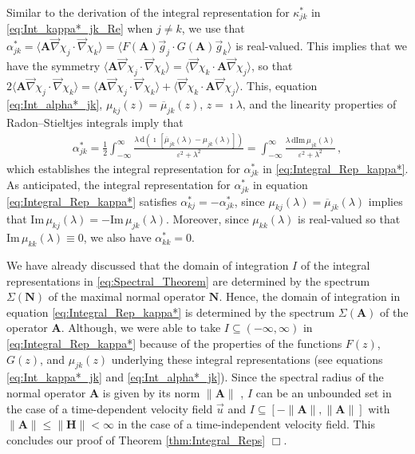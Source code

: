\documentclass[11pt]{amsart}
\renewcommand{\d}{\mathrm{d}}
\newcommand{\Hb}{\mathbf{H}}
\newcommand{\Ab}{\mathbf{A}}
\newcommand{\Nb}{\mathbf{N}}
\begin{document}
Similar to the derivation of the integral representation for
$\kappa^*_{jk}$ in \eqref{eq:Int_kappa*_jk_Re} when $j\neq k$, we use that
$\alpha^*_{jk}=\langle\Ab\vec{\nabla}\chi_j\cdot\vec{\nabla}\chi_k\rangle=\langle F(\Ab)\vec{g}_j\cdot G(\Ab)\vec{g}_k\rangle$
is real-valued. This implies that we have the symmetry
$\langle\Ab\vec{\nabla}\chi_j\cdot\vec{\nabla}\chi_k\rangle=\langle\vec{\nabla}\chi_k\cdot\Ab\vec{\nabla}\chi_j\rangle$, so that
$2\langle\Ab\vec{\nabla}\chi_j\cdot\vec{\nabla}\chi_k\rangle=\langle\Ab\vec{\nabla}\chi_j\cdot\vec{\nabla}\chi_k\rangle+\langle\vec{\nabla}\chi_k\cdot\Ab\vec{\nabla}\chi_j\rangle$.
This, equation \eqref{eq:Int_alpha*_jk},
$\mu_{kj}(z)=\overline{\mu}_{jk}(z)$, $z=\imath\lambda$, and the
linearity properties of Radon--Stieltjes integrals \cite{Stone:64}
imply that 
% 
\begin{align}\label{eq:Int_kappa*_jk_Im}
  \alpha^*_{jk}
       =\frac{1}{2}\int_{-\infty}^\infty\frac{\lambda\,\d(\imath\,[\overline{\mu}_{jk}(\lambda)-\mu_{jk}(\lambda)])}{\varepsilon^2+\lambda^2}
       =\int_{-\infty}^\infty\frac{\lambda\,\d\text{Im}\,\mu_{jk}(\lambda)}{\varepsilon^2+\lambda^2}\,,            
\end{align}
%
which establishes the integral representation for $\alpha^*_{jk}$ in
\eqref{eq:Integral_Rep_kappa*}. As anticipated, the integral
representation for $\alpha^*_{jk}$ in equation
\eqref{eq:Integral_Rep_kappa*} satisfies $\alpha^*_{kj}=-\alpha^*_{jk}$, since
$\mu_{kj}(\lambda)=\overline{\mu}_{jk}(\lambda)$ implies that
$\text{Im}\,\mu_{kj}(\lambda)=-\text{Im}\,\mu_{jk}(\lambda)$. Moreover, since
$\mu_{kk}(\lambda)$ is real-valued so that $\text{Im}\,\mu_{kk}(\lambda)\equiv0$, we also
have $\alpha^*_{kk}=0$.   



We have already discussed that the domain of integration $I$ of the
integral representations in \eqref{eq:Spectral_Theorem} are determined
by the spectrum $\Sigma(\Nb)$ of the maximal normal operator $\Nb$. Hence,
the domain of integration in equation \eqref{eq:Integral_Rep_kappa*}
is determined by the spectrum $\Sigma(\Ab)$ of the operator
$\Ab$. Although, we were able to take $I\subseteq(-\infty,\infty)$ in
\eqref{eq:Integral_Rep_kappa*} because of the properties of the
functions $F(z)$, $G(z)$, and $\mu_{jk}(z)$ underlying these integral
representations (see equations \eqref{eq:Int_kappa*_jk} and
\eqref{eq:Int_alpha*_jk}). Since the spectral radius of the normal
operator $\Ab$ is given by its norm $\|\Ab\|$ \cite{Reed-1980}, $I$ can
be an unbounded set in the case of a time-dependent velocity field
$\vec{u}$ and $I\subseteq[-\|\Ab\|,\|\Ab\|]$ with $\|\Ab\|\leq\|\Hb\|<\infty$ in the case of a
time-independent velocity field. This concludes our proof of Theorem
\ref{thm:Integral_Reps} $\Box$.    
\end{document}
